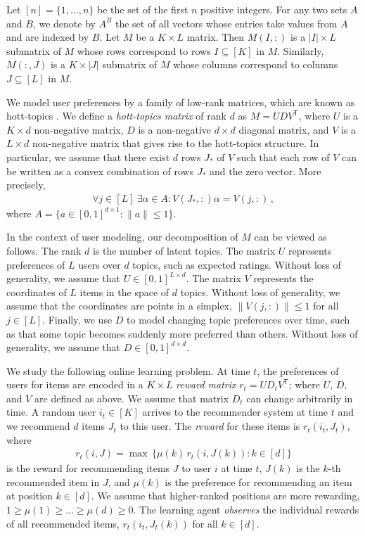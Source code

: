 
\newcommand{\transpose}{^\mathsf{\scriptscriptstyle T}}

Let $[n] = \{1, \dots, n\}$ be the set of the first $n$ positive integers. For any two sets $A$ and $B$, we denote by $A^B$ the set of all vectors whose entries take values from $A$ and are indexed by $B$. Let $M$ be a $K \times L$ matrix. Then $M(I, :)$ is a $|I| \times L$ submatrix of $M$ whose rows correspond to rows $I \subseteq [K]$ in $M$. Similarly, $M(:, J)$ is a $K \times |J|$ submatrix of $M$ whose columns correspond to columns $J \subseteq [L]$ in $M$.

We model user preferences by a family of low-rank matrices, which are known as hott-topics \cite{}. We define a \emph{hott-topics matrix} of rank $d$ as $M = U D V\transpose$, where $U$ is a $K \times d$ non-negative matrix, $D$ is a non-negative $d \times d$ diagonal matrix, and $V$ is a $L \times d$ non-negative matrix that gives rise to the hott-topics structure. In particular, we assume that there exist $d$ rows $J_\ast$ of $V$ such that each row of $V$ can be written as a convex combination of rows $J_\ast$ and the zero vector. More precisely,
\begin{align}
  \forall j \in [L] \ \exists \alpha \in A: V(J_\ast, :) \alpha = V(j, :)\,,
  \label{eq:hott topics}
\end{align}
where $A = \{a \in [0, 1]^{d \times 1}: \|a\| \leq 1\}$.

In the context of user modeling, our decomposition of $M$ can be viewed as follows. The rank $d$ is the number of latent topics. The matrix $U$ represents preferences of $L$ users over $d$ topics, such as expected ratings. Without loss of generality, we assume that $U \in [0, 1]^{L \times d}$. The matrix $V$ represents the coordinates of $L$ items in the space of $d$ topics. Without loss of generality, we assume that the coordinates are points in a simplex, $\|V(j, :)\| \leq 1$ for all $j \in [L]$. Finally, we use $D$ to model changing topic preferences over time, such as that some topic becomes suddenly more preferred than others. Without loss of generality, we assume that $D \in [0, 1]^{d \times d}$.

We study the following online learning problem. At time $t$, the preferences of users for items are encoded in a $K \times L$ \emph{reward matrix} $r_t = U D_t V\transpose$; where $U$, $D$, and $V$ are defined as above. We assume that matrix $D_t$ can change arbitrarily in time. A random user $i_t \in [K]$ arrives to the recommender system at time $t$ and we recommend $d$ items $J_t$ to this user. The \emph{reward} for these items is $r_t(i_t, J_t)$, where
\begin{align*}
  r_t(i, J) =
  \max \, \{\mu(k) \, r_t(i, J(k)): k \in [d]\}
\end{align*}
is the reward for recommending items $J$ to user $i$ at time $t$, $J(k)$ is the $k$-th recommended item in $J$, and $\mu(k)$ is the preference for recommending an item at position $k \in [d]$. We assume that higher-ranked positions are more rewarding, $1 \geq \mu(1) \geq \dots \geq \mu(d) \geq 0$. The learning agent \emph{observes} the individual rewards of all recommended items, $r_t(i_t, J_t(k))$ for all $k \in [d]$.

